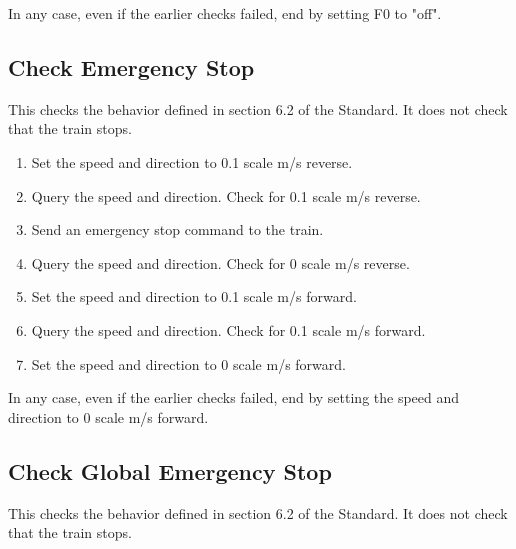 In any case, even if the earlier checks failed, end by setting F0 to "off".

\subsection{Check Emergency Stop}

This checks the behavior defined in section 6.2 of the Standard.
It does not check that the train stops.

\begin{enumerate}

    \item Set the speed and direction to 0.1 scale m/s reverse.

    \item Query the speed and direction. Check for 0.1 scale m/s reverse.

    \item Send an emergency stop command to the train.

    \item Query the speed and direction. Check for 0 scale m/s reverse.

    \item Set the speed and direction to 0.1 scale m/s forward.

    \item Query the speed and direction. Check for 0.1 scale m/s forward.

    \item Set the speed and direction to 0 scale m/s forward.

\end{enumerate}

In any case, even if the earlier checks failed, end by setting the speed 
and direction to 0 scale m/s forward.

\subsection{Check Global Emergency Stop}

This checks the behavior defined in section 6.2 of the Standard.
It does not check that the train stops.

